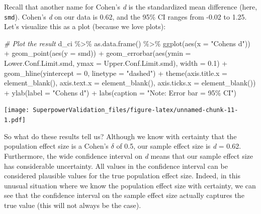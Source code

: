 \documentclass[
]{book}
\newenvironment{Shaded}{\begin{snugshade}}{\end{snugshade}}
\newcommand{\AttributeTok}[1]{\textcolor[rgb]{0.77,0.63,0.00}{#1}}
\newcommand{\CommentTok}[1]{\textcolor[rgb]{0.56,0.35,0.01}{\textit{#1}}}
\newcommand{\DecValTok}[1]{\textcolor[rgb]{0.00,0.00,0.81}{#1}}
\newcommand{\FloatTok}[1]{\textcolor[rgb]{0.00,0.00,0.81}{#1}}
\newcommand{\FunctionTok}[1]{\textcolor[rgb]{0.00,0.00,0.00}{#1}}
\newcommand{\NormalTok}[1]{#1}
\newcommand{\SpecialCharTok}[1]{\textcolor[rgb]{0.00,0.00,0.00}{#1}}
\newcommand{\StringTok}[1]{\textcolor[rgb]{0.31,0.60,0.02}{#1}}
\begin{document}
Recall that another name for Cohen's \emph{d} is the standardized mean difference (here, \texttt{smd}). Cohen's \emph{d} on our data is 0.62, and the 95\% CI ranges from -0.02 to 1.25. Let's visualize this as a plot (because we love plots):

\begin{Shaded}
\begin{Highlighting}[]
\CommentTok{\# Plot the result}
\NormalTok{d\_ci }\SpecialCharTok{\%\textgreater{}\%} 
  \FunctionTok{as.data.frame}\NormalTok{() }\SpecialCharTok{\%\textgreater{}\%} 
  \FunctionTok{ggplot}\NormalTok{(}\FunctionTok{aes}\NormalTok{(}\AttributeTok{x =} \StringTok{"Cohen\textquotesingle{}s d"}\NormalTok{)) }\SpecialCharTok{+}
  \FunctionTok{geom\_point}\NormalTok{(}\FunctionTok{aes}\NormalTok{(}\AttributeTok{y =}\NormalTok{ smd)) }\SpecialCharTok{+}
  \FunctionTok{geom\_errorbar}\NormalTok{(}\FunctionTok{aes}\NormalTok{(}\AttributeTok{ymin =}\NormalTok{ Lower.Conf.Limit.smd,}
                    \AttributeTok{ymax =}\NormalTok{ Upper.Conf.Limit.smd), }\AttributeTok{width =} \FloatTok{0.1}\NormalTok{) }\SpecialCharTok{+}
  \FunctionTok{geom\_hline}\NormalTok{(}\AttributeTok{yintercept =} \DecValTok{0}\NormalTok{, }\AttributeTok{linetype =} \StringTok{"dashed"}\NormalTok{) }\SpecialCharTok{+}
  \FunctionTok{theme}\NormalTok{(}\AttributeTok{axis.title.x =} \FunctionTok{element\_blank}\NormalTok{(),}
        \AttributeTok{axis.text.x =} \FunctionTok{element\_blank}\NormalTok{(),}
        \AttributeTok{axis.ticks.x =} \FunctionTok{element\_blank}\NormalTok{()) }\SpecialCharTok{+}
  \FunctionTok{ylab}\NormalTok{(}\AttributeTok{label =} \StringTok{"Cohen\textquotesingle{}s d"}\NormalTok{) }\SpecialCharTok{+}
  \FunctionTok{labs}\NormalTok{(}\AttributeTok{caption =} \StringTok{"Note: Error bar = 95\% CI"}\NormalTok{)}
\end{Highlighting}
\end{Shaded}

\texttt{[image: SuperpowerValidation\_files/figure-latex/unnamed-chunk-11-1.pdf]}

So what do these results tell us? Although we know with certainty that the population effect size is a Cohen's \(\delta\) of 0.5, our sample effect size is \emph{d} = 0.62. Furthermore, the wide confidence interval on \emph{d} means that our sample effect size has considerable uncertainty. All values in the confidence interval can be considered plausible values for the true population effect size. Indeed, in this unusual situation where we know the population effect size with certainty, we can see that the confidence interval on the sample effect size actually captures the true value (this will not always be the case).
\end{document}
